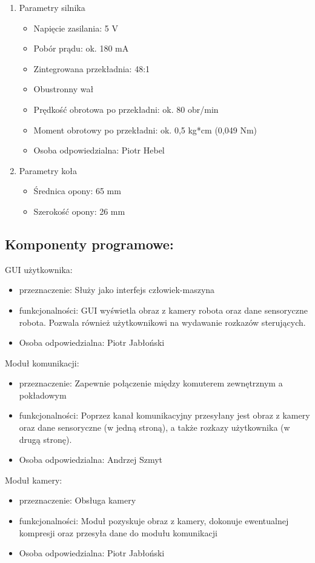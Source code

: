\documentclass[a4paper]{article}
\begin{document}
\begin{enumerate}
\item Parametry silnika
\begin{itemize}
\item Napięcie zasilania: 5 V
\item Pobór prądu: ok. 180 mA
\item Zintegrowana przekładnia: 48:1
\item Obustronny wał
\item Prędkość obrotowa po przekładni: ok. 80 obr/min
\item Moment obrotowy po przekładni: ok. 0,5 kg*cm (0,049 Nm)
\item Osoba odpowiedzialna: Piotr Hebel
\end{itemize}

\item Parametry koła
\begin{itemize}
\item Średnica opony: 65 mm
\item Szerokość opony: 26 mm
\end{itemize}
\end{enumerate}

\subsection{Komponenty programowe:}
GUI użytkownika:
\begin{itemize}
\item przeznaczenie: Służy jako interfejs człowiek-maszyna
\item funkcjonalności: GUI wyświetla obraz z kamery robota oraz dane sensoryczne robota. Pozwala również użytkownikowi na wydawanie rozkazów sterujących. 
\item Osoba odpowiedzialna: Piotr Jabłoński
\end{itemize}

Moduł komunikacji:
\begin{itemize}
\item przeznaczenie: Zapewnie połączenie między komuterem zewnętrznym a pokładowym
\item funkcjonalności: Poprzez kanał komunikacyjny przesyłany jest obraz z kamery oraz dane sensoryczne (w jedną stroną), a także rozkazy użytkownika (w drugą stronę).
\item Osoba odpowiedzialna: Andrzej Szmyt
\end{itemize}

Moduł kamery:
\begin{itemize}
\item przeznaczenie: Obsługa kamery
\item funkcjonalności: Moduł pozyskuje obraz z kamery, dokonuje ewentualnej kompresji oraz przesyła dane do modułu komunikacji
\item Osoba odpowiedzialna: Piotr Jabłoński
\end{itemize}
\end{document}

